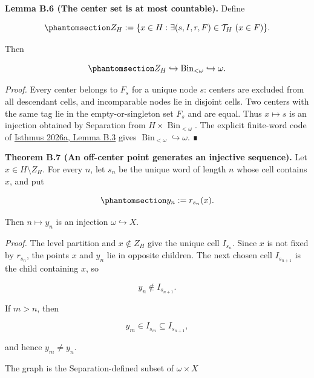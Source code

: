 \documentclass[
  english,
  11pt,
  reqno]{amsart}
\begin{document}
\textbf{Lemma B.6 (The center set is at most countable).} Define

\begin{equation}\protect\phantomsection\label{eq:typefree-center-set}{
Z_H
:=
\{x\in H:\exists(s,I,r,F)\in\mathcal T_H\ (x\in F)\}.
}\end{equation}

Then

\begin{equation}\protect\phantomsection\label{eq:typefree-center-countable}{
Z_H\hookrightarrow\operatorname{Bin}_{<\omega}\hookrightarrow\omega.
}\end{equation}

\emph{Proof.} Every center belongs to \(F_s\) for a unique node \(s\):
centers are excluded from all descendant cells, and incomparable nodes
lie in disjoint cells. Two centers with the same tag lie in the
empty-or-singleton set \(F_s\) and are equal. Thus \(x\mapsto s\) is an
injection obtained by Separation from
\(H\times\operatorname{Bin}_{<\omega}\). The explicit finite-word code
of \hyperref[ref:isthmus2026a]{Isthmus 2026a, Lemma B.3} gives
\(\operatorname{Bin}_{<\omega}\hookrightarrow\omega\). ∎

\protect{}\label{thm:b-7-off-center}

\textbf{Theorem B.7 (An off-center point generates an injective
sequence).} Let \(x\in H\setminus Z_H\). For every \(n\), let \(s_n\) be
the unique word of length \(n\) whose cell contains \(x\), and put

\begin{equation}\protect\phantomsection\label{eq:typefree-off-center-sequence}{
y_n:=r_{s_n}(x).
}\end{equation}

Then \(n\mapsto y_n\) is an injection \(\omega\hookrightarrow X\).

\emph{Proof.} The level partition and \(x\notin Z_H\) give the unique
cell \(I_{s_n}\). Since \(x\) is not fixed by \(r_{s_n}\), the points
\(x\) and \(y_n\) lie in opposite children. The next chosen cell
\(I_{s_{n+1}}\) is the child containing \(x\), so

\[
y_n\notin I_{s_{n+1}}.
\]

If \(m>n\), then

\[
y_m\in I_{s_m}\subseteq I_{s_{n+1}},
\]

and hence \(y_m\ne y_n\).

The graph is the Separation-defined subset of \(\omega\times X\)
\end{document}
